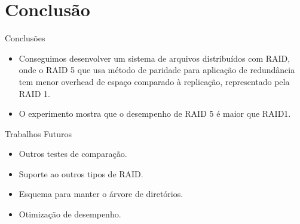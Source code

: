 \section{Conclusão}

\begin{frame}{Conclusões}
	\begin{itemize}
		\item Conseguimos desenvolver um sistema de arquivos distribuídos com RAID, onde o RAID 5 que usa método de paridade para aplicação de redundância tem menor overhead de espaço comparado à replicação, representado pela RAID 1.
		\item O experimento mostra que o desempenho de RAID 5 é maior que RAID1.
	\end{itemize}
\end{frame}

\begin{frame}{Trabalhos Futuros}
	\begin{itemize}
		\item Outros testes de comparação.
		\item Suporte ao outros tipos de RAID.
		\item Esquema para manter o árvore de diretórios.
		\item Otimização de desempenho.
	\end{itemize}
\end{frame}
